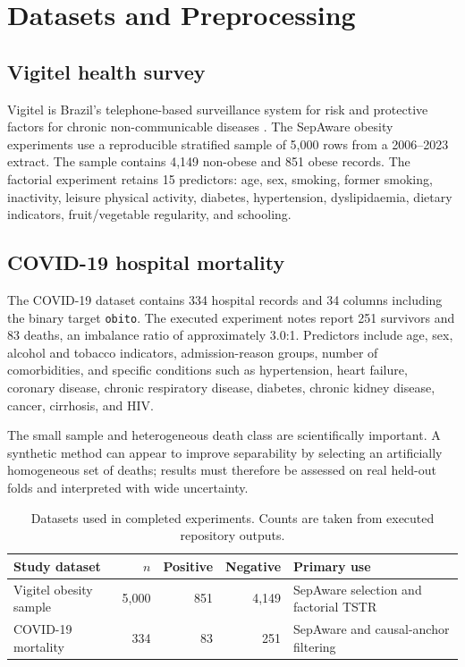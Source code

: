 \chapter{Datasets and Preprocessing}
\label{chap:data}

\section{Vigitel health survey}

Vigitel is Brazil's telephone-based surveillance system for risk and protective factors for chronic non-communicable diseases \citep{bernal2017}. The SepAware obesity experiments use a reproducible stratified sample of 5,000 rows from a 2006--2023 extract. The sample contains 4,149 non-obese and 851 obese records. The factorial experiment retains 15 predictors: age, sex, smoking, former smoking, inactivity, leisure physical activity, diabetes, hypertension, dyslipidaemia, dietary indicators, fruit/vegetable regularity, and schooling.

\section{COVID-19 hospital mortality}

The COVID-19 dataset contains 334 hospital records and 34 columns including the binary target \texttt{obito}. The executed experiment notes report 251 survivors and 83 deaths, an imbalance ratio of approximately 3.0:1. Predictors include age, sex, alcohol and tobacco indicators, admission-reason groups, number of comorbidities, and specific conditions such as hypertension, heart failure, coronary disease, chronic respiratory disease, diabetes, chronic kidney disease, cancer, cirrhosis, and HIV.

The small sample and heterogeneous death class are scientifically important. A synthetic method can appear to improve separability by selecting an artificially homogeneous set of deaths; results must therefore be assessed on real held-out folds and interpreted with wide uncertainty.

\begin{table}[htbp]
\centering
\caption{Datasets used in completed experiments. Counts are taken from executed repository outputs.}
\label{tab:datasets}
\begin{tabularx}{\textwidth}{lrrrX}
\toprule
Study dataset & $n$ & Positive & Negative & Primary use\\
\midrule
Vigitel obesity sample & 5,000 & 851 & 4,149 & SepAware selection and factorial TSTR\\
COVID-19 mortality & 334 & 83 & 251 & SepAware and causal-anchor filtering\\
\bottomrule
\end{tabularx}
\end{table}


